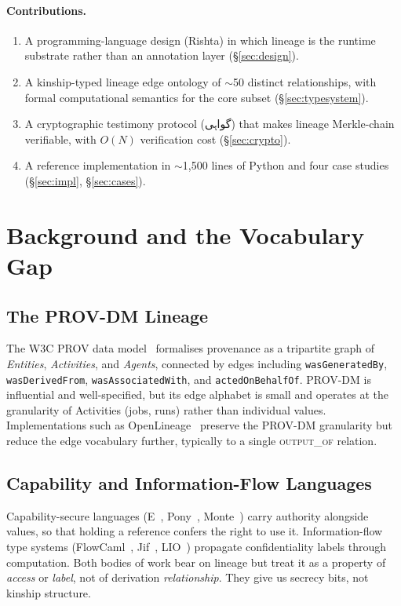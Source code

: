 \documentclass[10pt,twocolumn]{article}
\newcommand{\ur}[1]{{\urdufont #1}}
\begin{document}
\paragraph{Contributions.}
\begin{enumerate}
\item A programming-language design (Rishta) in which lineage is the runtime substrate rather than an annotation layer (\S\ref{sec:design}).
\item A kinship-typed lineage edge ontology of $\sim$50 distinct relationships, with formal computational semantics for the core sub\-set (\S\ref{sec:typesystem}).
\item A cryptographic testimony protocol (\ur{گواہی}) that makes lineage Merkle-chain verifiable, with $O(N)$ verification cost (\S\ref{sec:crypto}).
\item A reference implementation in $\sim$1{,}500 lines of Python and four case studies (\S\ref{sec:impl}, \S\ref{sec:cases}).
\end{enumerate}

\section{Background and the Vocabulary Gap}
\label{sec:background}

\subsection{The PROV-DM Lineage}

The W3C PROV data model~\cite{prov-dm} formalises provenance as a tripartite graph of \emph{Entities}, \emph{Activities}, and \emph{Agents}, connected by edges including \texttt{wasGeneratedBy}, \texttt{wasDerivedFrom}, \texttt{wasAssociatedWith}, and \texttt{actedOnBehalfOf}. PROV-DM is influential and well-specified, but its edge alphabet is small and operates at the granularity of Activities (jobs, runs) rather than individual values. Implementations such as OpenLineage~\cite{openlineage} preserve the PROV-DM granularity but reduce the edge vocabulary further, typically to a single \textsc{output\_of} relation.

\subsection{Capability and Information-Flow Languages}

Capability-secure languages (E~\cite{e-language}, Pony~\cite{pony}, Monte~\cite{monte}) carry authority alongside values, so that holding a reference confers the right to use it. Information-flow type systems (FlowCaml~\cite{flowcaml}, Jif~\cite{jif}, LIO~\cite{lio}) propagate confidentiality labels through computation. Both bodies of work bear on lineage but treat it as a property of \emph{access} or \emph{label}, not of derivation \emph{relationship}. They give us secrecy bits, not kinship structure.
\end{document}
